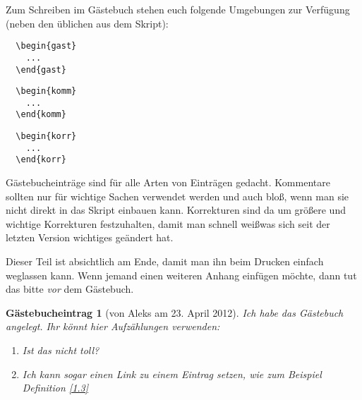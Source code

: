 \documentclass[paper = A4, fontsize=12pt, numbers=noendperiod, chapterprefix=true]{scrbook}
\theoremstyle{break}
\theoremstyle{nonumberbreak}
\newtheorem{gast}{G\"astebucheintrag}
\newtheorem{komm}{Kommentar}
\newtheorem{korr}{Korrktur}
\theoremstyle{nonumberplain}
\begin{document}
Zum Schreiben im G\"astebuch stehen euch folgende Umgebungen zur Verf\"ugung (neben den \"ublichen aus dem Skript):
\begin{center}\begin{minipage}{0.3\textwidth}\begin{verbatim}
  \begin{gast}
    ...
  \end{gast}
\end{verbatim}\end{minipage}
\begin{minipage}{0.3\textwidth}\begin{verbatim}  
  \begin{komm}
    ...  
  \end{komm}
\end{verbatim}\end{minipage}
\begin{minipage}{0.3\textwidth}\begin{verbatim}  
  \begin{korr}
    ...  
  \end{korr}
\end{verbatim}\end{minipage}\end{center}
G\"astebucheintr\"age sind f\"ur alle Arten von Eintr\"agen gedacht. Kommentare sollten nur f\"ur wichtige Sachen verwendet werden und auch blo\ss,  wenn man sie nicht direkt in das Skript einbauen kann. Korrekturen sind da um gr\"o\ss ere und wichtige Korrekturen festzuhalten, damit man schnell wei\ss was sich seit der letzten Version wichtiges ge\"andert hat.

Dieser Teil ist absichtlich am Ende, damit man ihn beim Drucken einfach weglassen kann. Wenn jemand einen weiteren Anhang einf\"ugen m\"ochte, dann tut das bitte \emph{vor} dem G\"astebuch.\\

\begin{gast}[von Aleks am 23. April 2012]
Ich habe das G\"astebuch angelegt. Ihr k\"onnt hier Aufz\"ahlungen verwenden:
\begin{enumerate}[1)]
\item
  Ist das nicht toll?
\item
  Ich kann sogar einen Link zu einem Eintrag setzen, wie zum Beispiel Definition \ref{1.3}
\end{enumerate}
\end{gast}
\end{document}
